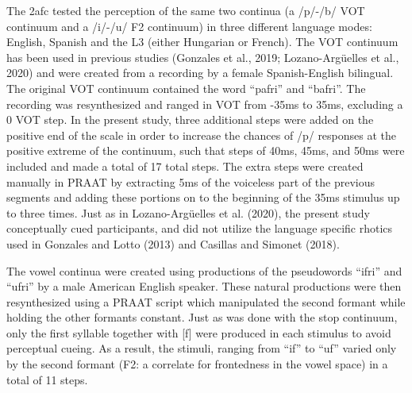 \documentclass[
  man]{apa6}
\begin{document}
The 2afc tested the perception of the same two continua (a /p/-/b/ VOT continuum and a /i/-/u/ F2 continuum) in three different language modes: English, Spanish and the L3 (either Hungarian or French). The VOT continuum has been used in previous studies (Gonzales et al., 2019; Lozano-Argüelles et al., 2020) and were created from a recording by a female Spanish-English bilingual. The original VOT continuum contained the word ``pafri'' and ``bafri''. The recording was resynthesized and ranged in VOT from -35ms to 35ms, excluding a 0 VOT step. In the present study, three additional steps were added on the positive end of the scale in order to increase the chances of /p/ responses at the positive extreme of the continuum, such that steps of 40ms, 45ms, and 50ms were included and made a total of 17 total steps. The extra steps were created manually in PRAAT by extracting 5ms of the voiceless part of the previous segments and adding these portions on to the beginning of the 35ms stimulus up to three times.
Just as in Lozano-Argüelles et al. (2020), the present study conceptually cued participants, and did not utilize the language specific rhotics used in Gonzales and Lotto (2013) and Casillas and Simonet (2018).

The vowel continua were created using productions of the pseudowords ``ifri'' and ``ufri'' by a male American English speaker. These natural productions were then resynthesized using a PRAAT script which manipulated the second formant while holding the other formants constant.
Just as was done with the stop continuum, only the first syllable together with {[}f{]} were produced in each stimulus to avoid perceptual cueing. As a result, the stimuli, ranging from ``if'' to ``uf'' varied only by the second formant (F2: a correlate for frontedness in the vowel space) in a total of 11 steps.
\end{document}
